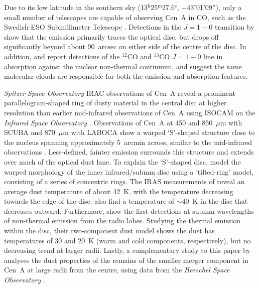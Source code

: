 Due to its low latitude in the southern sky (13$^{\mathrm{h}}$25$^{\mathrm{m}}$27.6$^{\mathrm{s}}$, $-43^{\circ}$01'09''), only a small number of telescopes are capable of observing Cen~A in CO, such as the Swedish-ESO Submillimeter Telescope \citep[SEST; e.g.][]{1987ApJ...322L..73P,1990ApJ...363..451E,1992ApJ...391..121Q,1993A&A...270L..13R}.  Detections in the $J=1-0$ transition by \citet{1990ApJ...363..451E} show that the emission primarily traces the optical disc, but drops off significantly beyond about 90~arcsec on either side of the centre of the disc. In addition, \citet{1990ApJ...363..451E} and \citet{1990ApJ...365..522E} report detections of the $^{12}$CO and $^{13}$CO $J=1-0$ line in absorption against the nuclear non-thermal continuum, and suggest the same molecular clouds are responsible for both the emission and absorption features.

\emph{Spitzer Space Observatory} IRAC observations of Cen~A \citep[][]{2006ApJ...645.1092Q} reveal a prominent parallelogram-shaped ring of dusty material in the central disc at higher resolution than earlier mid-infrared observations of Cen~A using ISOCAM on the \emph{Infrared Space Observatory} \citep[ISO; ][]{1999A&A...341..667M}.  Observations of Cen~A at 450 and 850~$\mu$m with SCUBA and 870~$\mu$m with LABOCA show a warped `S'-shaped structure close to the nucleus spanning approximately 5~arcmin across, similar to the mid-infrared observations \citep{2002ApJ...565..131L,2008A&A...490...77W}.  Less-defined, fainter emission surrounds this structure and extends over much of the optical dust lane.  To explain the `S'-shaped disc, \citet{2006ApJ...645.1092Q} model the warped morphology of the inner infrared/submm disc using a 'tilted-ring' model, consisting of a series of concentric rings.  The IRAS measurements of \citet{1990ApJ...363..451E} reveal an average dust temperature of about 42~K, with the temperature decreasing towards the edge of the disc.  \citet{2002ApJ...565..131L} also find a temperature of $\sim 40$~K in the disc that decreases outward.  Furthermore, \citet{2008A&A...490...77W} show the first detections at submm wavelengths of non-thermal emission from the radio lobes.  Studying the thermal emission within the disc, their two-component dust model shows the dust has temperatures of 30 and 20~K (warm and cold components, respectively), but no decreasing trend at larger radii.  Lastly, a complementary study to this paper by \citet{Auld_2011_submit} analyses the dust properties of the remains of the smaller merger component in Cen~A at large radii from the centre, using data from the \emph{Herschel Space Observatory} \citep{2010A&A...518L...1P}.

